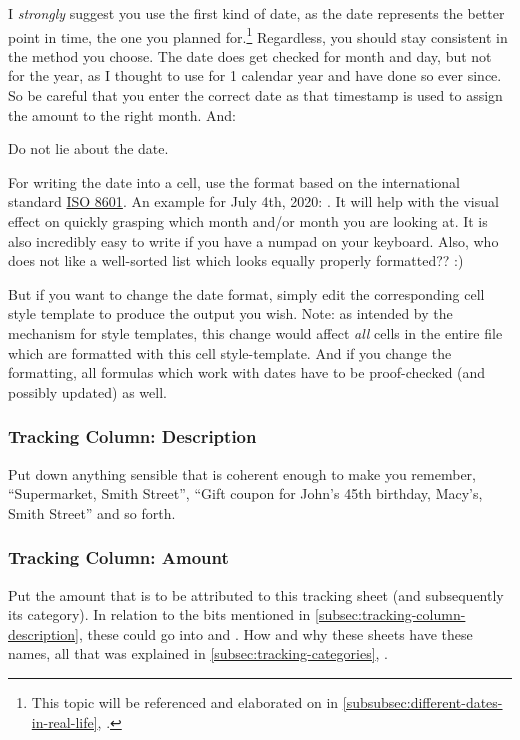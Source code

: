 I \emph{strongly} suggest you use the first kind of date, as the date represents the better point in time, \ie the one you planned for.\footnote{This topic will be referenced and elaborated on in \autoref{subsubsec:different-dates-in-real-life}, .}
Regardless, you should stay consistent in the method you choose.
The date does get checked for month and day, but not for the year, as I thought to use \tfn for 1 calendar year and have done so ever since.
So be careful that you enter the correct date as that timestamp is used to assign the amount to the right month.
And:
\begin{specialnote}
	Do not lie about the date.
\end{specialnote}

For writing the date into a cell, use the format  based on the international standard \href{https://en.wikipedia.org/wiki/ISO_8601}{ISO 8601}.
An example for July 4th, 2020: .
It will help with the visual effect on quickly grasping which month and/or month you are looking at.
It is also incredibly easy to write if you have a numpad on your keyboard.
Also, who does not like a well-sorted list which looks equally properly formatted?? :)

But if you want to change the date format, simply edit the corresponding cell style template to produce the output you wish.
Note: as intended by the mechanism for style templates, this change would affect \emph{all} cells in the entire file which are formatted with this cell style-template.
And if you change the formatting, all formulas which work with dates have to be proof-checked (and possibly updated) as well.

\subsubsection{Tracking Column: Description}
\label{subsec:tracking-column-description}

Put down anything sensible that is coherent enough to make you remember, \eg ``Supermarket, Smith Street'', ``Gift coupon for John's 45th birthday, Macy's, Smith Street'' and so forth.

\subsubsection{Tracking Column: Amount}
\label{subsec:tracking-column-amount}

Put the amount that is to be attributed to this tracking sheet (and subsequently its category).
In relation to the bits mentioned in \autoref{subsec:tracking-column-description}, these could go into  and .
How and why these sheets have these names, all that was explained in \autoref{subsec:tracking-categories}, .

